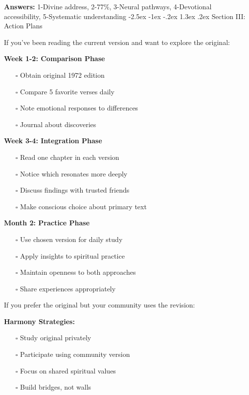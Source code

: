 \documentclass[12pt,twoside]{book}
\makeatletter
\renewcommand\section{\@startsection{section}{1}{\z@}%
{-2.5ex \@plus -1ex \@minus -.2ex}%
{1.3ex \@plus.2ex}%
{\normalfont\Large\bfseries}}
\makeatother
\begin{document}
\textbf{\textbf{Answers:}} 1-Divine address, 2-77\%, 3-Neural pathways, 4-Devotional accessibility, 5-Systematic understanding
\section{Section III: Action Plans}
\label{sec:org0ca46d0}

If you've been reading the current version and want to explore the original:

\textbf{\textbf{Week 1-2: Comparison Phase}}
\begin{itemize}
\item[{$\square$}] Obtain original 1972 edition
\item[{$\square$}] Compare 5 favorite verses daily
\item[{$\square$}] Note emotional responses to differences
\item[{$\square$}] Journal about discoveries
\end{itemize}

\textbf{\textbf{Week 3-4: Integration Phase}}
\begin{itemize}
\item[{$\square$}] Read one chapter in each version
\item[{$\square$}] Notice which resonates more deeply
\item[{$\square$}] Discuss findings with trusted friends
\item[{$\square$}] Make conscious choice about primary text
\end{itemize}

\textbf{\textbf{Month 2: Practice Phase}}
\begin{itemize}
\item[{$\square$}] Use chosen version for daily study
\item[{$\square$}] Apply insights to spiritual practice
\item[{$\square$}] Maintain openness to both approaches
\item[{$\square$}] Share experiences appropriately
\end{itemize}

If you prefer the original but your community uses the revision:

\textbf{\textbf{Harmony Strategies:}}
\begin{itemize}
\item[{$\square$}] Study original privately
\item[{$\square$}] Participate using community version
\item[{$\square$}] Focus on shared spiritual values
\item[{$\square$}] Build bridges, not walls
\end{itemize}
\end{document}
